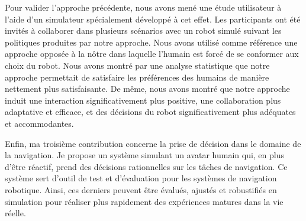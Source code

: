 Pour valider l'approche précédente, nous avons mené une étude utilisateur à l'aide d'un simulateur spécialement développé à cet effet. Les participants ont été invités à collaborer dans plusieurs scénarios avec un robot simulé suivant les politiques produites par notre approche. Nous avons utilisé comme référence une approche opposée à la nôtre dans laquelle l'humain est forcé de se conformer aux choix du robot. Nous avons montré par une analyse statistique que notre approche permettait de satisfaire les préférences des humains de manière nettement plus satisfaisante. De même, nous avons montré que notre approche induit une interaction significativement plus positive, une collaboration plus adaptative et efficace, et des décisions du robot significativement plus adéquates et accommodantes.

Enfin, ma troisième contribution concerne la prise de décision dans le domaine de la navigation. Je propose un système simulant un avatar humain qui, en plus d'être réactif, prend des décisions rationnelles sur les tâches de navigation. Ce système sert d'outil de test et d'évaluation pour les systèmes de navigation robotique. Ainsi, ces derniers peuvent être évalués, ajustés et robustifiés en simulation pour réaliser plus rapidement des expériences matures dans la vie réelle.